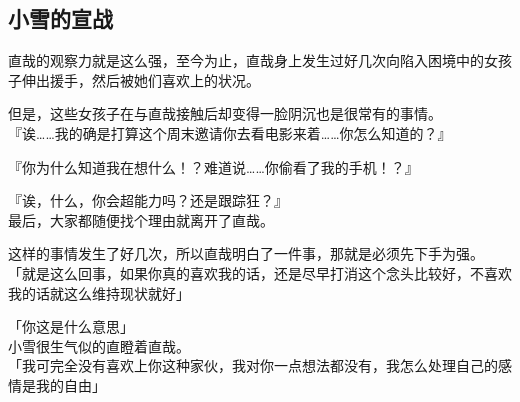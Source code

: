 \subsection{小雪的宣战}

直哉的观察力就是这么强，至今为止，直哉身上发生过好几次向陷入困境中的女孩子伸出援手，然后被她们喜欢上的状况。

但是，这些女孩子在与直哉接触后却变得一脸阴沉也是很常有的事情。\\

『诶……我的确是打算这个周末邀请你去看电影来着……你怎么知道的？』

『你为什么知道我在想什么！？难道说……你偷看了我的手机！？』

『诶，什么，你会超能力吗？还是跟踪狂？』\\

最后，大家都随便找个理由就离开了直哉。

这样的事情发生了好几次，所以直哉明白了一件事，那就是必须先下手为强。\\

「就是这么回事，如果你真的喜欢我的话，还是尽早打消这个念头比较好，不喜欢我的话就这么维持现状就好」

「你这是什么意思」\\

小雪很生气似的直瞪着直哉。\\

「我可完全没有喜欢上你这种家伙，我对你一点想法都没有，我怎么处理自己的感情是我的自由」

